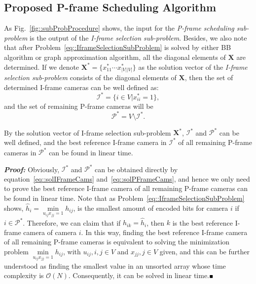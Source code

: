 \subsection{Proposed P-frame Scheduling Algorithm}
\label{sec::PFrameScheduling}
As Fig.~\ref{fig::subProbProcedure} shows, the input for the \emph{P-frame scheduling sub-problem} is the output of the \emph{I-frame selection sub-problem}.
Besides, we also note that after Problem~\eqref{eq::IframeSelectionSubProblem} is solved by either BB algorithm or graph approximation algorithm, all the diagonal elements of $\mathbf{X}$ are determined.
If we denote ${\mathbf{X}^* = \{ x_{11}^* \cdots x_{|V||V|}^* \}}$ as the solution vector of the \emph{I-frame selection sub-problem} consists of the diagonal elements of $\mathbf{X}$, then the set of determined I-frame cameras can be well defined as:
\begin{equation}
\mathcal{I}^* = \{ i \in V | x_{ii}^* = 1\},
\label{eq::solIFrameCams}
\end{equation}
and the set of remaining P-frame cameras will be
\begin{equation}
\mathcal{P}^* = V \setminus \mathcal{I}^*.
\label{eq::solPFrameCams}
\end{equation} 
%
\begin{mylem}
By the solution vector of I-frame selection sub-problem $\mathbf{X}^*$, $\mathcal{I}^*$ and $\mathcal{P}^*$ can be well defined, and the best reference I-frame camera in $\mathcal{I}^*$ of all remaining P-frame cameras in $\mathcal{P}^*$ can be found in linear time.
\label{lemma::findBestICamEasy}
\end{mylem}
\textbf{\emph{Proof:}}
Obviously, $\mathcal{I}^*$ and $\mathcal{P}^*$ can be obtained directly by equation~\eqref{eq::solIFrameCams} and~\eqref{eq::solPFrameCams}, and hence we only need to prove the best reference I-frame camera of all remaining P-frame cameras can be found in linear time.
Note that as Problem~\eqref{eq::IframeSelectionSubProblem} shows, ${\hat{h}_i = \underset{u_{ij}x_{jj} = 1}{\min} h_{ij}}$, is the smallest amount of encoded bits for camera $i$ if $i \in \mathcal{P}^*$.
Therefore, we can claim that if $h_{ik} = \hat{h}_i$, then $k$ is the best reference I-frame camera of camera $i$.
In this way, finding the best reference I-frame camera of all remaining P-frame cameras is equivalent to solving the minimization problem ${\underset{u_{ij}x_{jj} = 1}{\min} h_{ij}}$, with ${u_{ij}, i,j \in V}$ and ${x_{jj}, j \in V}$ given, and this can be further understood as finding the smallest value in an unsorted array whose time complexity is $\mathcal{O}(N)$.
Consequently, it can be solved in linear time.\hfill$\mathsmaller{\mathsmaller{\blacksquare}}$

